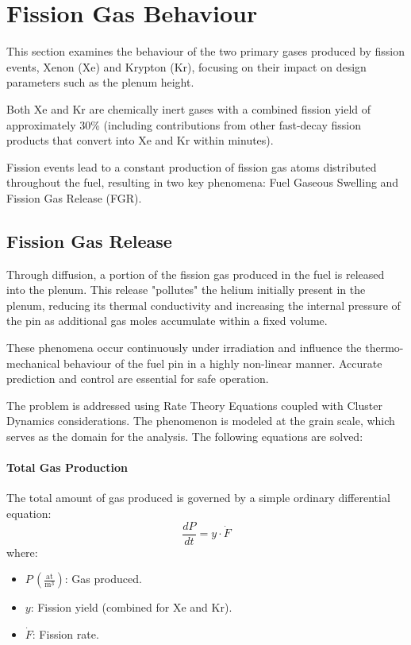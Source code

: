 \section{Fission Gas Behaviour}

This section examines the behaviour of the two primary gases produced by fission events, Xenon (Xe) and Krypton (Kr), focusing on their impact on design parameters such as the plenum height.

Both Xe and Kr are chemically inert gases with a combined fission yield of approximately 30\% (including contributions from other fast-decay fission products that convert into Xe and Kr within minutes).

Fission events lead to a constant production of fission gas atoms distributed throughout the fuel, resulting in two key phenomena: Fuel Gaseous Swelling and Fission Gas Release (FGR).

\subsection{Fission Gas Release}

Through diffusion, a portion of the fission gas produced in the fuel is released into the plenum. This release "pollutes" the helium initially present in the plenum, reducing its thermal conductivity and increasing the internal pressure of the pin as additional gas moles accumulate within a fixed volume.

These phenomena occur continuously under irradiation and influence the thermo-mechanical behaviour of the fuel pin in a highly non-linear manner. Accurate prediction and control are essential for safe operation.

The problem is addressed using Rate Theory Equations coupled with Cluster Dynamics considerations. The phenomenon is modeled at the grain scale, which serves as the domain for the analysis. The following equations are solved:

\paragraph{Total Gas Production}
The total amount of gas produced is governed by a simple ordinary differential equation:
\begin{equation}
    \frac{dP}{dt} = y \cdot \dot{F}
\end{equation}
where:
\begin{itemize}
    \item $P \, \left(\frac{\text{at}}{\text{m}^3}\right)$: Gas produced.
    \item $y$: Fission yield (combined for Xe and Kr).
    \item $\dot{F}$: Fission rate.
\end{itemize}

